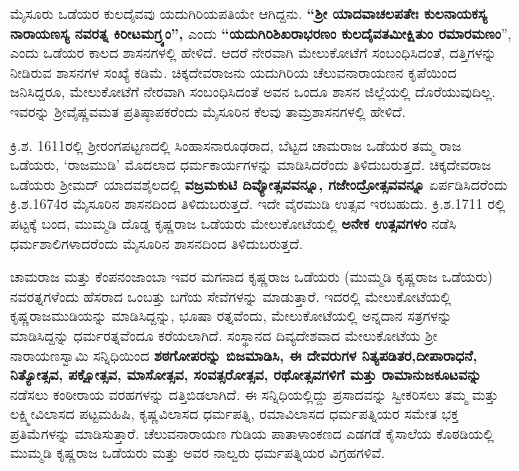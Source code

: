 ಮೈಸೂರು ಒಡೆಯರ ಕುಲದೈವವು ಯದುಗಿರಿಯಪತಿಯೇ ಆಗಿದ್ದನು. \textbf{“ಶ‍್ರೀ ಯಾದವಾಚಲಪತೇಃ ಕುಲನಾಯಕಸ್ಯ ನಾರಾಯಣಸ್ಯ ನವರತ್ನ ಕಿರೀಟಮಗ್ರ್ಯಂ”,} ಎಂದು \textbf{“ಯದುಗಿರಿಶಿಖರಾಭರಣಂ ಕುಲದೈವತಮೀಕ್ಷಿತುಂ ರಮಾರಮಣಂ}”, ಎಂದು ಒಡೆಯರ ಕಾಲದ ಶಾಸನಗಳಲ್ಲಿ ಹೇಳಿದೆ. ಆದರೆ ನೇರವಾಗಿ ಮೇಲುಕೋಟೆಗೆ ಸಂಬಂಧಿಸಿದಂತೆ, ದತ್ತಿಗಳನ್ನು ನೀಡಿರುವ ಶಾಸನಗಳ ಸಂಖ್ಯೆ ಕಡಿಮೆ. ಚಿಕ್ಕದೇವರಾಜನು ಯದುಗಿರಿಯ ಚೆಲುವನಾರಾಯಣನ ಕೃಪೆಯಿಂದ ಜನಿಸಿದ್ದರೂ, ಮೇಲುಕೋಟೆಗೆ ನೇರವಾಗಿ ಸಂಬಂಧಿಸಿದಂತೆ ಅವನ ಒಂದೂ ಶಾಸನ ಜಿಲ್ಲೆಯಲ್ಲಿ ದೊರೆಯುವುದಿಲ್ಲ. ಇವರನ್ನು ಶ‍್ರೀವೈಷ್ಣವಮತ ಪ್ರತಿಷ್ಠಾಪಕರೆಂದು ಮೈಸೂರಿನ ಕೆಲವು ತಾಮ್ರಶಾಸನಗಳಲ್ಲಿ ಹೇಳಿದೆ.

ಕ್ರಿ.ಶ. 1611ರಲ್ಲಿ ಶ‍್ರೀರಂಗಪಟ್ಟಣದಲ್ಲಿ ಸಿಂಹಾಸನಾರೂಢರಾದ, ಬೆಟ್ಟದ ಚಾಮರಾಜ ಒಡೆಯರ ತಮ್ಮ ರಾಜ ಒಡೆಯರು, ‘ರಾಜಮುಡಿ’ ಮೊದಲಾದ ಧರ್ಮಕಾರ್ಯಗಳನ್ನು ಮಾಡಿಸಿದರೆಂದು ತಿಳಿದುಬರುತ್ತದೆ. ಚಿಕ್ಕದೇವರಾಜ ಒಡೆಯರು ಶ‍್ರೀಮದ್​ ಯಾದವಶೈಲದಲ್ಲಿ \textbf{ವಜ್ರಮಕುಟಿ ದಿವ್ಯೋತ್ಸವವನ್ನೂ, ಗಜೇಂದ್ರೋತ್ಸವವನ್ನೂ} ಏರ್ಪಡಿಸಿದರೆಂದು ಕ್ರಿ.ಶ.1674ರ ಮೈಸೂರಿನ ಶಾಸನದಿಂದ ತಿಳಿದುಬರುತ್ತದೆ. ಇದೇ ವೈರಮುಡಿ ಉತ್ಸವ ಇರಬಹುದು. ಕ್ರಿ.ಶ.1711 ರಲ್ಲಿ ಪಟ್ಟಕ್ಕೆ ಬಂದ, ಮುಮ್ಮಡಿ ದೊಡ್ಡ ಕೃಷ್ಣರಾಜ ಒಡೆಯರು ಮೇಲುಕೋಟೆಯಲ್ಲಿ \textbf{ಅನೇಕ ಉತ್ಸವಗಳಂ} ನಡೆಸಿ ಧರ್ಮಶಾಲಿಗಳಾದ\-ರೆಂದು ಮೈಸೂರಿನ ಶಾಸನದಿಂದ ತಿಳಿದುಬರುತ್ತದೆ.

ಚಾಮರಾಜ ಮತ್ತು ಕೆಂಪನಂಜಾಂಬಾ ಇವರ ಮಗನಾದ ಕೃಷ್ಣರಾಜ ಒಡೆಯರು (ಮುಮ್ಮಡಿ ಕೃಷ್ಣರಾಜ ಒಡೆಯರು) ನವರತ್ನಗಳೆಂದು ಹೆಸರಾದ ಒಂಬತ್ತು ಬಗೆಯ ಸೇವೆಗಳನ್ನು ಮಾಡುತ್ತಾರೆ. ಇದರಲ್ಲಿ ಮೇಲುಕೋಟೆಯಲ್ಲಿ ಕೃಷ್ಣರಾಜಮುಡಿ\-ಯನ್ನು ಮಾಡಿಸಿದ್ದನ್ನು, ಭೂಷಾ ರತ್ನವೆಂದು, ಮೇಲುಕೋಟೆಯಲ್ಲಿ ಅನ್ನದಾನ ಸತ್ರಗಳನ್ನು ಮಾಡಿಸಿದ್ದನ್ನು ಧರ್ಮರತ್ನವೆಂದೂ ಕರೆಯಲಾಗಿದೆ. ಸಂಸ್ಥಾನದ ದಿವ್ಯದೇಶವಾದ ಮೇಲುಕೋಟೆಯ ಶ‍್ರೀ ನಾರಾಯಣಸ್ವಾಮಿ ಸನ್ನಿಧಿಯಿಂದ \textbf{ಶಠಗೋಪರನ್ನು ಬಿಜಮಾಡಿಸಿ, ಈ ದೇವರುಗಳ ನಿತ್ಯಪಡಿತರ,ದೀಪಾರಾಧನೆ, ನಿತ್ಯೋತ್ಸವ, ಪಕ್ಷೋತ್ಸವ, ಮಾಸೋತ್ಸವ, ಸಂವತ್ಸರೋತ್ಸವ, ರಥೋತ್ಸವಗಳಿಗೆ ಮತ್ತು ರಾಮಾನುಜಕೂಟವನ್ನು} ನಡೆಸಲು ಕಂಠೀರಾಯ ವರಹಗಳನ್ನು ದತ್ತಿಬಿಡಲಾಗಿದೆ. ಈ ಸನ್ನಿಧಿಯಲ್ಲಿದ್ದು ಪ್ರಸಾದವನ್ನು ಸ್ವೀಕರಿಸಲು ತಮ್ಮ ಮತ್ತು ಲಕ್ಷ್ಮೀವಿಲಾಸದ ಪಟ್ಟಮಹಿಷಿ, ಕೃಷ್ಣವಿಲಾಸದ ಧರ್ಮಪತ್ನಿ, ರಮಾವಿಲಾಸದ ಧರ್ಮಪತ್ನಿಯರ ಸಮೇತ ಭಕ್ತ ಪ್ರತಿಮೆಗಳನ್ನು ಮಾಡಿಸುತ್ತಾರೆ. ಚೆಲುವನಾರಾಯಣ ಗುಡಿಯ ಪಾತಾಳಾಂಕಣದ ಎಡಗಡೆ ಕೈಸಾಲೆಯ ಕೊಠಡಿಯಲ್ಲಿ ಮುಮ್ಮಡಿ ಕೃಷ್ಣರಾಜ ಒಡೆಯರು ಮತ್ತು ಅವರ ನಾಲ್ವರು ಧರ್ಮಪತ್ನಿಯರ ವಿಗ್ರಹಗಳಿವೆ.

